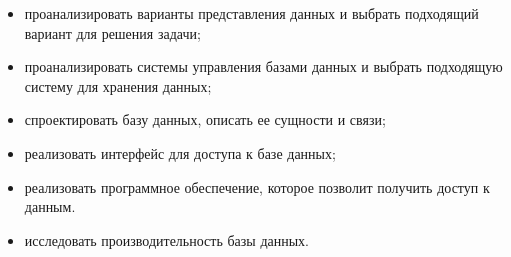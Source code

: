 \begin{itemize}
    \item проанализировать варианты представления данных и выбрать подходящий вариант для решения задачи;
    \item проанализировать системы управления базами данных и выбрать подходящую систему для хранения данных;
    \item спроектировать базу данных, описать ее сущности и связи;
    \item реализовать интерфейс для доступа к базе данных;
    \item реализовать программное обеспечение, которое позволит получить доступ к данным.
    \item исследовать производительность базы данных.
\end{itemize}